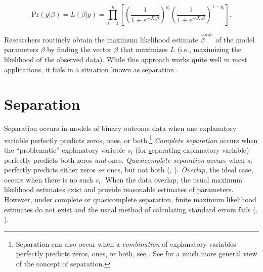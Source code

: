 \documentclass[12pt]{article}
\begin{document}
\begin{equation}\nonumber
\text{Pr}(y | \beta) = L(\beta | y) = \displaystyle \prod_{i = 1}^n \left[\left( \dfrac{1}{1 + e^{-X_i\beta}}\right)^{y_i}\left( \dfrac{1}{1 + e^{-X_i\beta}}\right)^{1 - y_i}\right]\text{.}
\end{equation}

Researchers routinely obtain the maximum likelihood estimate $\hat{\beta}^{mle}$ of the model parameters $\beta$ by finding the vector $\beta$ that maximizes $L$ (i.e., maximizing the likelihood of the observed data). While this approach works quite well in most applications, it fails in a situation known as separation \citep{Zorn2005}.

\section*{Separation}

Separation occurs in models of binary outcome data when one explanatory variable perfectly predicts zeros, ones, or both.\footnote{Separation can also occur when a \emph{combination} of explanatory variables perfectly predicts zeros, ones, or both, see \cite{LesaffreAlbert1989}. See \cite{Geyer2009} for a much more general view of the concept of separation.} \textit{Complete separation} occurs when the ``problematic'' explanatory variable $s_i$ (for \underline{s}eparating explanatory variable) perfectly predicts both zeros \emph{and} ones. \textit{Quasicomplete separation} occurs when $s_i$ perfectly predicts either zeros \emph{or} ones, but not both (\citealt{AlbertAnderson1984}, \citealt{Zorn2005}). \textit{Overlap}, the ideal case, occurs when there is no such $s_i$. When the data overlap, the usual maximum likelihood estimates exist and provide reasonable estimates of parameters. However, under complete or quasicomplete separation, finite maximum likelihood estimates do not exist and the usual method of calculating standard errors fails (\citealt{AlbertAnderson1984}, \citealt{Zorn2005}).
\end{document}
